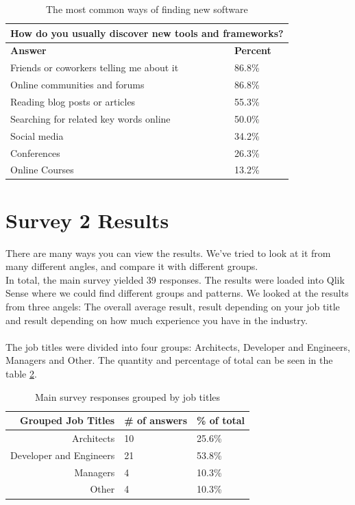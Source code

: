 \documentclass{cslthse-msc}
\begin{document}
    \begin{table}[H]
        \centering
        \caption{The most common ways of finding new software}
        \label{tab:discover}
        \begin{tabularx}{\columnwidth}{X|l}
            \multicolumn{2}{c}{\textbf{How do you usually discover new tools and frameworks?}} \\ \hline \hline
            \textbf{Answer} & \textbf{Percent} \\ \hline
            Friends or coworkers telling me about it	&	86.8\% \\
            Online communities and forums	&	86.8\% \\
            Reading blog posts or articles	&	55.3\% \\
            Searching for related key words online	&	50.0\% \\
            Social media	&	34.2\% \\
            Conferences	&	26.3\% \\
            Online Courses	&	13.2\% \\ \hline
        \end{tabularx}
    \end{table}

    \section{Survey 2 Results}
    There are many ways you can view the results. We've tried to look at it from many different angles, and compare it with different groups. \\
    In total, the main survey yielded 39 responses. The results were loaded into Qlik Sense
    where we could find different groups and patterns. We looked at the
    results from three angels: The overall average result, result depending
    on your job title and result depending on how much experience you have
    in the industry.
    \\ \\
    The job titles were divided into four groups: Architects, Developer and
    Engineers, Managers and Other. The quantity and percentage of total can
    be seen in the table \ref{tabl:jobs}.

    \begin{table}[H]
        \centering
        \caption{Main survey responses grouped by job titles}
        \label{tabl:jobs}
        \begin{tabularx}{\columnwidth}{r l l}
            \textbf{Grouped Job Titles} &    \textbf{\# of answers} &     \textbf{\% of total} \\\hline
            Architects              & 10           & 25.6\%  \\ \hline
            Developer and Engineers & 21           & 53.8\%  \\\hline
            Managers                & 4            & 10.3\%  \\\hline
            Other                   & 4            & 10.3\%  \\\hline
        \end{tabularx}
    \end{table}
\end{document}
